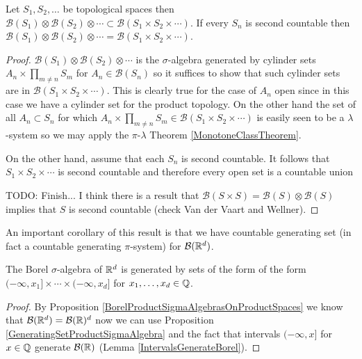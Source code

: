 \begin{prop}\label{BorelProductSigmaAlgebrasOnProductSpaces}Let $S_1, S_2, \dotsc$ be topological spaces then
  $\mathcal{B}(S_1) \otimes \mathcal{B}(S_2) \otimes \dotsb \subset
  \mathcal{B}(S_1 \times S_2 \times \dotsb)$.  If every $S_n$ is
  second countable then $\mathcal{B}(S_1) \otimes \mathcal{B}(S_2) \otimes \dotsb =
  \mathcal{B}(S_1 \times S_2 \times \dotsb)$.
\end{prop}
\begin{proof}
$\mathcal{B}(S_1) \otimes \mathcal{B}(S_2) \otimes \dotsb$ is the
$\sigma$-algebra generated by cylinder sets $A_n \times \prod_{m \neq
  n} S_m$ for $A_n \in \mathcal{B}(S_n)$ so it suffices to show that
such cylinder sets are in $\mathcal{B}(S_1 \times S_2 \times
\dotsb)$.  This is clearly true for the case of $A_n$ open since in
this case we have a cylinder set for the product topology.  On the
other hand the set of all $A_n \subset S_n$ for which $A_n \times \prod_{m \neq
  n} S_m \in \mathcal{B}(S_1 \times S_2 \times \dotsb)$ is easily seen
to be a $\lambda$-system so we may apply the $\pi$-$\lambda$ Theorem
\ref{MonotoneClassTheorem}.

On the other hand, assume that each $S_n$ is second countable.  It
follows that $S_1 \times S_2 \times \dotsb$ is second countable and
therefore every open set is a countable union 

TODO: Finish...  I think there is a result that $\mathcal{B}(S \times
S) = \mathcal{B}(S) \otimes \mathcal{B}(S)$ implies that $S$ is second
countable (check Van der Vaart and Wellner).
\end{proof}

An important corollary of this result is that we have countable generating set (in fact a countable generating $\pi$-system) 
for $\mathcal{B}(\mathbb{R}^d)$.
\begin{cor}\label{MultidimensionalIntervalsGenerateBorel}The Borel $\sigma$-algebra of
  $\mathbb{R}^d$ is generated by sets of the form
  of the form $(-\infty, x_1] \times \dotsb \times (-\infty, x_d]$ for $x_1, \dotsc, x_d \in \mathbb{Q}$.
\end{cor}
\begin{proof}
 By Proposition \ref{BorelProductSigmaAlgebrasOnProductSpaces} we know that
$\mathcal{B}(\mathbb{R}^d)=\mathcal{B}(\mathbb{R})^d$ now we can use Proposition \ref{GeneratingSetProductSigmaAlgebra}
and the fact that intervals $(-\infty,x]$ for $x \in \mathbb{Q}$ generate $\mathcal{B}(\mathbb{R})$ (Lemma \ref{IntervalsGenerateBorel}).
\end{proof}

